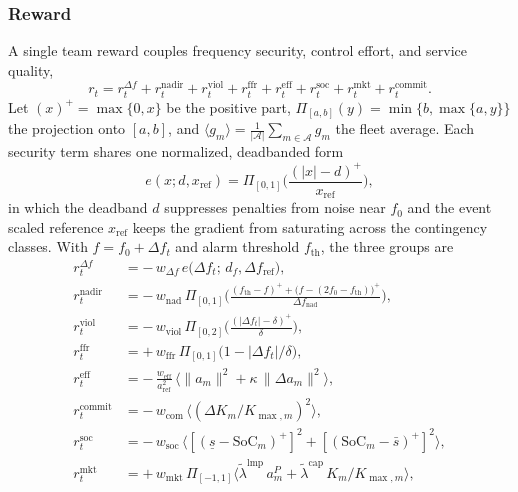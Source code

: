 \documentclass[lettersize,journal]{IEEEtran}
\begin{document}
	\subsubsection{Reward}
	A single team reward couples frequency security, control effort, and service quality,
	\begin{equation}
		r_t = r^{\Delta f}_t + r^{\mathrm{nadir}}_t + r^{\mathrm{viol}}_t
		+ r^{\mathrm{ffr}}_t + r^{\mathrm{eff}}_t + r^{\mathrm{soc}}_t
		+ r^{\mathrm{mkt}}_t + r^{\mathrm{commit}}_t .
		\label{eq:reward}
	\end{equation}
	Let $(x)^+=\max\{0,x\}$ be the positive part, $\Pi_{[a,b]}(y)=\min\{b,\max\{a,y\}\}$ the projection onto $[a,b]$, and $\langle g_m\rangle=\frac{1}{|\mathcal{A}|}\sum_{m\in\mathcal{A}}g_m$ the fleet average. Each security term shares one normalized, deadbanded form
	\begin{equation}
		e(x;d,x_{\mathrm{ref}})=\Pi_{[0,1]}\!\Big(\frac{(|x|-d)^+}{x_{\mathrm{ref}}}\Big),
		\label{eq:rew_template}
	\end{equation}
	in which the deadband $d$ suppresses penalties from noise near $f_0$ and the event scaled reference $x_{\mathrm{ref}}$ keeps the gradient from saturating across the contingency classes. With $f=f_0+\Delta f_t$ and alarm threshold $f_{\mathrm{th}}$, the three groups are
	\begin{align}
		r^{\Delta f}_t &= -\,w_{\Delta f}\,e\big(\Delta f_t;\,d_f,\Delta f_{\mathrm{ref}}\big),\label{eq:r_deltaf}\\
		r^{\mathrm{nadir}}_t &= -\,w_{\mathrm{nad}}\,\Pi_{[0,1]}\!\Big(\tfrac{(f_{\mathrm{th}}-f)^+ +\big(f-(2f_0-f_{\mathrm{th}})\big)^+}{\Delta f_{\mathrm{nad}}}\Big),\label{eq:r_nadir}\\
		r^{\mathrm{viol}}_t &= -\,w_{\mathrm{viol}}\,\Pi_{[0,2]}\!\Big(\tfrac{(|\Delta f_t|-\delta)^+}{\delta}\Big),\label{eq:r_viol}\\
		r^{\mathrm{ffr}}_t &= +\,w_{\mathrm{ffr}}\,\Pi_{[0,1]}\!\big(1-|\Delta f_t|/\delta\big),\label{eq:r_ffr}\\
		r^{\mathrm{eff}}_t &= -\,\frac{w_{\mathrm{eff}}}{a_{\mathrm{ref}}^2}\,\big\langle \|a_m\|^2+\kappa\,\|\Delta a_m\|^2\big\rangle,\label{eq:r_eff}\\
		r^{\mathrm{commit}}_t &= -\,w_{\mathrm{com}}\,\big\langle (\Delta K_m/K_{\max,m})^2\big\rangle,\label{eq:r_commit}\\
		r^{\mathrm{soc}}_t &= -\,w_{\mathrm{soc}}\,\big\langle [(\underline s-\mathrm{SoC}_m)^+]^2+[(\mathrm{SoC}_m-\bar s)^+]^2\big\rangle,\label{eq:r_soc}\\
		r^{\mathrm{mkt}}_t &= +\,w_{\mathrm{mkt}}\,\Pi_{[-1,1]}\!\big\langle \tilde\lambda^{\mathrm{lmp}}\,a^P_m+\tilde\lambda^{\mathrm{cap}}\,K_m/K_{\max,m}\big\rangle,\label{eq:r_mkt}
	\end{align}
\end{document}
